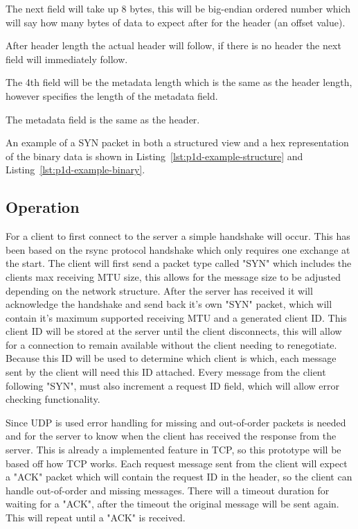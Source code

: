 The next field will take up 8 bytes, this will be big-endian ordered number which will say how many bytes of data to expect after for the header (an offset value).

After header length the actual header will follow, if there is no header the next field will immediately follow.

The 4th field will be the metadata length which is the same as the header length, however specifies the length of the metadata field.

The metadata field is the same as the header.

An example of a SYN packet in both a structured view and a hex representation of the binary data is shown in Listing~\ref{lst:p1d-example-structure} and Listing~\ref{lst:p1d-example-binary}.

\subsection*{Operation}
For a client to first connect to the server a simple handshake will occur. This has been based on the rsync protocol handshake which only requires one exchange at the start. The client will first send a packet type called "SYN" which includes the clients max receiving MTU size, this allows for the message size to be adjusted depending on the network structure. After the server has received it will acknowledge the handshake and send back it's own "SYN" packet, which will contain it's maximum supported receiving MTU and a generated client ID. This client ID will be stored at the server until the client disconnects, this will allow for a connection to remain available without the client needing to renegotiate. Because this ID will be used to determine which client is which, each message sent by the client will need this ID attached. Every message from the client following "SYN", must also increment a request ID field, which will allow error checking functionality.

Since UDP is used error handling for missing and out-of-order packets is needed and for the server to know when the client has received the response from the server. This is already a implemented feature in TCP, so this prototype will be based off how TCP works. Each request message sent from the client will expect a "ACK" packet which will contain the request ID in the header, so the client can handle out-of-order and missing messages. There will a timeout duration for waiting for a "ACK", after the timeout the original message will be sent again. This will repeat until a "ACK" is received.

